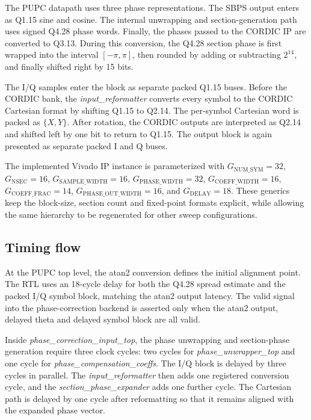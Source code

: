 The PUPC datapath uses three phase representations. The \ac{SBPS} output enters as Q1.15 sine and cosine. The internal unwrapping and section-generation path uses signed Q4.28 phase words. Finally, the phases passed to the CORDIC IP are converted to Q3.13. During this conversion, the Q4.28 section phase is first wrapped into the interval \([-\pi,\pi]\), then rounded by adding or subtracting \(2^{14}\), and finally shifted right by 15 bits.

The I/Q samples enter the block as separate packed Q1.15 buses. Before the CORDIC bank, the \textit{input\_reformatter} converts every symbol to the CORDIC Cartesian format by shifting Q1.15 to Q2.14. The per-symbol Cartesian word is packed as \(\{X,Y\}\). After rotation, the CORDIC outputs are interpreted as Q2.14 and shifted left by one bit to return to Q1.15. The output block is again presented as separate packed I and Q buses.

The implemented Vivado IP instance is parameterized with \(G_{\mathrm{NUM\_SYM}}=32\), \(G_{\mathrm{NSEC}}=16\), \(G_{\mathrm{SAMPLE\_WIDTH}}=16\), \(G_{\mathrm{PHASE\_WIDTH}}=32\), \(G_{\mathrm{COEFF\_WIDTH}}=16\), \(G_{\mathrm{COEFF\_FRAC}}=14\), \(G_{\mathrm{PHASE\_OUT\_WIDTH}}=16\), and \(G_{\mathrm{DELAY}}=18\). These generics keep the block-size, section count and fixed-point formats explicit, while allowing the same hierarchy to be regenerated for other sweep configurations.

\subsection{Timing flow}

At the PUPC top level, the atan2 conversion defines the initial alignment point. The RTL uses an 18-cycle delay for both the Q4.28 spread estimate and the packed I/Q symbol block, matching the atan2 output latency. The valid signal into the phase-correction backend is asserted only when the atan2 output, delayed theta and delayed symbol block are all valid.

Inside \textit{phase\_correction\_input\_top}, the phase unwrapping and section-phase generation require three clock cycles: two cycles for \textit{phase\_unwrapper\_top} and one cycle for \textit{phase\_compensation\_coeffs}. The I/Q block is delayed by three cycles in parallel. The \textit{input\_reformatter} then adds one registered conversion cycle, and the \textit{section\_phase\_expander} adds one further cycle. The Cartesian path is delayed by one cycle after reformatting so that it remains aligned with the expanded phase vector.

